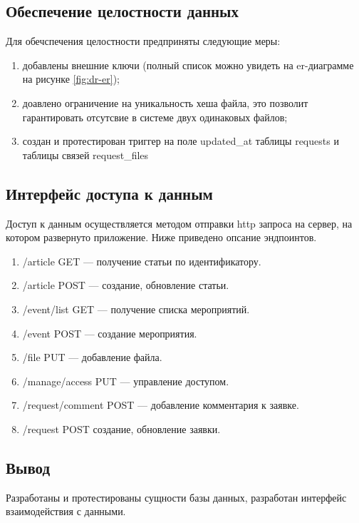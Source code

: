 \subsection{Обеспечение целостности данных}

Для обечспечения целостности предприняты следующие меры:
\begin{enumerate}
	\item добавлены внешние ключи (полный список можно увидеть на er-диаграмме на рисунке \ref{fig:dr-er});
	\item доавлено ограничение на уникальность хеша файла, это позволит гарантировать отсутсвие в системе двух одинаковых файлов;
	\item создан и протестирован триггер на поле updated{\_}at таблицы requests и таблицы связей request{\_}files
\end{enumerate}


\subsection{Интерфейс доступа к данным}

Доступ к данным осуществляется методом отправки http запроса на сервер, на котором развернуто приложение. Ниже приведено опсание эндпоинтов.

\begin{enumerate}
	\item /article GET --- получение статьи по идентификатору.
	\item /article POST --- создание, обновление статьи.
	\item /event/list GET --- получение списка мероприятий.
	\item /event POST --- создание мероприятия.
	\item /file PUT --- добавление файла.
	\item /manage/access PUT --- управление доступом.
	\item /request/comment POST --- добавление комментария к заявке.
	\item /request POST создание, обновление заявки.
\end{enumerate}

\subsection{Вывод}

Разработаны и протестированы сущности базы данных, разработан интерфейс взаимодействия с данными.

\pagebreak